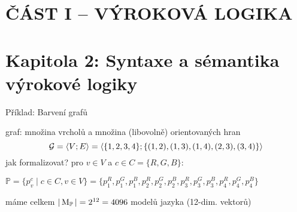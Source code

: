 \documentclass{beamer}
\begin{document}
\section*{ČÁST I -- VÝROKOVÁ LOGIKA}


\section{\sc Kapitola 2: Syntaxe a sémantika výrokové logiky}




\begin{frame}{Příklad: Barvení grafů}


    
    graf: množina vrcholů a množina (libovolně) \alert{orientovaných} hran
    \[
    \mathcal{G} = \langle V; E \rangle = \langle \{1,2,3,4\}; \{(1,2),(1,3),(1,4),(2,3),(3,4)\} \rangle
    \]
    jak formalizovat? pro $v\in V$ a $c\in C=\{R,G,B\}$:

    \mbox{\small $\mathbb P=\{p_v^c\mid c\in C,v\in V\}=\{p_1^R,p_1^G,p_1^B,p_2^R,p_2^G,p_2^B,p_3^R,p_3^G,p_3^B,p_4^R,p_4^G,p_4^B\}$}

máme celkem \( |\operatorname{M}_\mathbb P|=2^{12}=4096 \) \alert{modelů jazyka} (12-dim. vektorů)
\end{frame}
\end{document}
